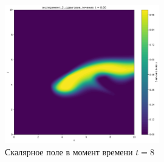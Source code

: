 \begin{figure}[h]
	\centering
	\includegraphics[width=0.6\textwidth]{imgs/эксперимент_2:_сдвиговое_течение_t8.00.png}
	\caption{Скалярное поле в момент времени $t=8$ }
\end{figure}